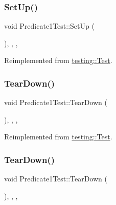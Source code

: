 \mbox{\label{class_predicate1_test_a26ffe626e992d5983e6a48c965b0a0a9}} 
\subsubsection{\texorpdfstring{SetUp()}{SetUp()}\hspace{0.1cm}{\footnotesize\ttfamily [3/3]}}
{\footnotesize\ttfamily void Predicate1\+Test\+::\+Set\+Up (\begin{DoxyParamCaption}{ }\end{DoxyParamCaption})\hspace{0.3cm}{\ttfamily [inline]}, {\ttfamily [override]}, {\ttfamily [protected]}, {\ttfamily [virtual]}}



Reimplemented from \mbox{\hyperlink{classtesting_1_1_test_a190315150c303ddf801313fd1a777733}{testing\+::\+Test}}.

\mbox{\label{class_predicate1_test_aacedc6281afabd551ae2e67777016f3d}} 
\subsubsection{\texorpdfstring{TearDown()}{TearDown()}\hspace{0.1cm}{\footnotesize\ttfamily [1/3]}}
{\footnotesize\ttfamily void Predicate1\+Test\+::\+Tear\+Down (\begin{DoxyParamCaption}{ }\end{DoxyParamCaption})\hspace{0.3cm}{\ttfamily [inline]}, {\ttfamily [override]}, {\ttfamily [protected]}, {\ttfamily [virtual]}}



Reimplemented from \mbox{\hyperlink{classtesting_1_1_test_a5f0ab439802cbe0ef7552f1a9f791923}{testing\+::\+Test}}.

\mbox{\label{class_predicate1_test_aacedc6281afabd551ae2e67777016f3d}} 
\subsubsection{\texorpdfstring{TearDown()}{TearDown()}\hspace{0.1cm}{\footnotesize\ttfamily [2/3]}}
{\footnotesize\ttfamily void Predicate1\+Test\+::\+Tear\+Down (\begin{DoxyParamCaption}{ }\end{DoxyParamCaption})\hspace{0.3cm}{\ttfamily [inline]}, {\ttfamily [override]}, {\ttfamily [protected]}, {\ttfamily [virtual]}}




